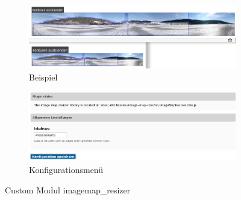 \begin{figure}[H]
	\centering
	\begin{subfigure}[b]{0.45\textwidth}
		\centering
		\includegraphics[width=0.95\linewidth]{images/example_imagemapresizer}
		\caption[]{Beispiel}
		\label{fig:example_imagemapresizer}
	\end{subfigure}
	\begin{subfigure}[b]{0.45\textwidth}
		\centering
		\includegraphics[width=0.95\linewidth]{images/config_imagemapresizer}
		\caption[]{Konfigurationsmenü}
		\label{fig:config_imagemapresizer}
	\end{subfigure}
	\caption{Custom Modul imagemap\_resizer}
	\label{fig:imagemap_resizer}
\end{figure}

